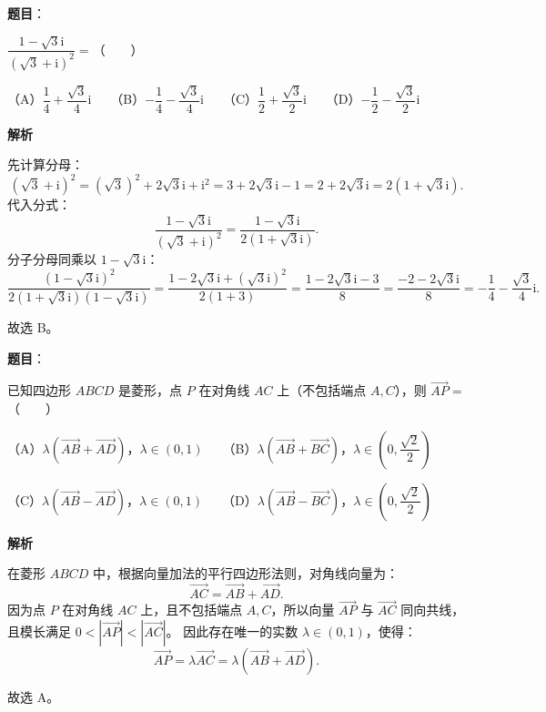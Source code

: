 \begin{answer}

\textbf{题目}：

$\dfrac{1 - \sqrt{3}\mathrm{i}}{(\sqrt{3} + \mathrm{i})^2} =$\mbox{（　　）}

（A）$\dfrac{1}{4} + \dfrac{\sqrt{3}}{4}\mathrm{i}$　　（B）$-\dfrac{1}{4} - \dfrac{\sqrt{3}}{4}\mathrm{i}$　　（C）$\dfrac{1}{2} + \dfrac{\sqrt{3}}{2}\mathrm{i}$　　（D）$-\dfrac{1}{2} - \dfrac{\sqrt{3}}{2}\mathrm{i}$

\textbf{解析}

先计算分母：
\nopagebreak[4]
\[(\sqrt{3} + \mathrm{i})^2 = (\sqrt{3})^2 + 2\sqrt{3}\mathrm{i} + \mathrm{i}^2 = 3 + 2\sqrt{3}\mathrm{i} - 1 = 2 + 2\sqrt{3}\mathrm{i} = 2(1 + \sqrt{3}\mathrm{i}).\]
代入分式：
\nopagebreak[4]
\[\frac{1 - \sqrt{3}\mathrm{i}}{(\sqrt{3} + \mathrm{i})^2} = \frac{1 - \sqrt{3}\mathrm{i}}{2(1 + \sqrt{3}\mathrm{i})}.\]
分子分母同乘以 $1 - \sqrt{3}\mathrm{i}$：
\nopagebreak[4]
\[\frac{(1 - \sqrt{3}\mathrm{i})^2}{2(1 + \sqrt{3}\mathrm{i})(1 - \sqrt{3}\mathrm{i})} = \frac{1 - 2\sqrt{3}\mathrm{i} + (\sqrt{3}\mathrm{i})^2}{2(1 + 3)} = \frac{1 - 2\sqrt{3}\mathrm{i} - 3}{8} = \frac{-2 - 2\sqrt{3}\mathrm{i}}{8} = -\frac{1}{4} - \frac{\sqrt{3}}{4}\mathrm{i}.\]

故选 B。


\end{answer}
\begin{answer}

\textbf{题目}：

已知四边形 $ABCD$ 是菱形，点 $P$ 在对角线 $AC$ 上（不包括端点 $A, C$），则 $\vec{AP} =$\mbox{（　　）}

（A）$\lambda(\vec{AB} + \vec{AD})$，$\lambda \in (0, 1)$　　（B）$\lambda(\vec{AB} + \vec{BC})$，$\lambda \in \left(0, \dfrac{\sqrt{2}}{2}\right)$

（C）$\lambda(\vec{AB} - \vec{AD})$，$\lambda \in (0, 1)$　　（D）$\lambda(\vec{AB} - \vec{BC})$，$\lambda \in \left(0, \dfrac{\sqrt{2}}{2}\right)$

\textbf{解析}

在菱形 $ABCD$ 中，根据向量加法的平行四边形法则，对角线向量为：
\nopagebreak[4]
\[\vec{AC} = \vec{AB} + \vec{AD}.\]
因为点 $P$ 在对角线 $AC$ 上，且不包括端点 $A, C$，所以向量 $\vec{AP}$ 与 $\vec{AC}$ 同向共线，且模长满足 $0 < |\vec{AP}| < |\vec{AC}|$。
因此存在唯一的实数 $\lambda \in (0, 1)$，使得：
\nopagebreak[4]
\[\vec{AP} = \lambda \vec{AC} = \lambda(\vec{AB} + \vec{AD}).\]

故选 A。


\end{answer}
